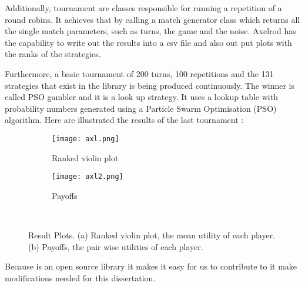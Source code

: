 Additionally, tournament are classes responsible for running a repetition of a
round robins. It achieves that by calling a match generator class which
returns all the single match parameters, such as turns, the game and the noise.
Axelrod has the capability to write out the results into a csv file and also out
put plots with the ranks of the strategies.

Furthermore, a basic tournament of 200 turns, 100 repetitions and the 131 strategies
that exist in the library is being produced continuously. The winner is called
PSO gambler and it is a look up strategy. It uses a lookup table with probability
numbers generated using a Particle Swarm Optimisation (PSO) algorithm.
Here are illustrated the results of the last tournament :

\begin{figure}[h]
\centering
    \begin{subfigure}[t]{0.55\textwidth}
    \centering
        \texttt{[image: axl.png]}
    \caption{Ranked violin plot}
    \end{subfigure}
\hfill
    \begin{subfigure}[t]{0.50\textwidth}\centering
    \centering
        \texttt{[image: axl2.png]}
    \caption{Payoffs}
    \end{subfigure}
~
\caption{Result Plots. (a) Ranked violin plot, the mean utility of each player.
(b) Payoffs, the pair wise utilities of each player.}
\label{fig:axelrodplots}
\end{figure}


Because is an open source library it makes it easy for us to contribute to it
make modifications needed for this dissertation.


